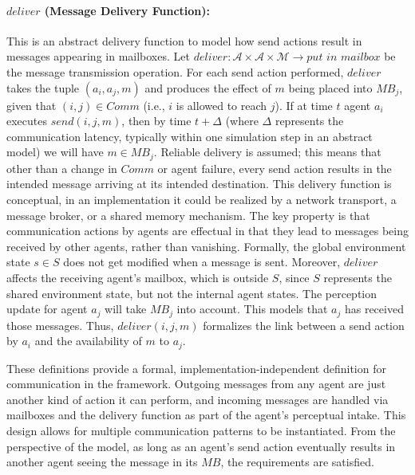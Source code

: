 \paragraph{$deliver$ (Message Delivery Function):} This is an abstract delivery function to model how send actions result in messages appearing in mailboxes. Let $\mathit{deliver}: \mathcal{A} \times \mathcal{A} \times \mathcal{M} \to {\textit{put in mailbox}}$ be the message transmission operation. For each send action performed, $deliver$ takes the tuple $(a_i, a_j, m)$ and produces the effect of $m$ being placed into $MB_j$, given that $(i,j) \in Comm$ (i.e., $i$ is allowed to reach $j$). If at time $t$ agent $a_i$ executes $send(i,j,m)$, then by time $t+\Delta$ (where $\Delta$ represents the communication latency, typically within one simulation step in an abstract model) we will have $m \in MB_j$. Reliable delivery is assumed; this means that other than a change in $Comm$ or agent failure, every send action results in the intended message arriving at its intended destination. 
This delivery function is conceptual, in an implementation it could be realized by a network transport, a message broker, or a shared memory mechanism. The key property is that communication actions by agents are effectual in that they lead to messages being received by other agents, rather than vanishing. Formally, the global environment state $s \in S$ does not get modified when a message is sent. Moreover, $deliver$ affects the receiving agent’s mailbox, which is outside $S$, since $S$ represents the shared environment state, but not the internal agent states. The perception update for agent $a_j$ will take $MB_j$ into account. This models that $a_j$ has received those messages. Thus, $deliver(i,j,m)$ formalizes the link between a send action by $a_i$ and the availability of $m$ to $a_j$.

These definitions provide a formal, implementation-independent definition for communication in the framework. Outgoing messages from any agent are just another kind of action it can perform, and incoming messages are handled via mailboxes and the delivery function as part of the agent’s perceptual intake. This design allows for multiple communication patterns to be instantiated. From the perspective of the model, as long as an agent’s send action eventually results in another agent seeing the message in its $MB$, the requirements are satisfied.


